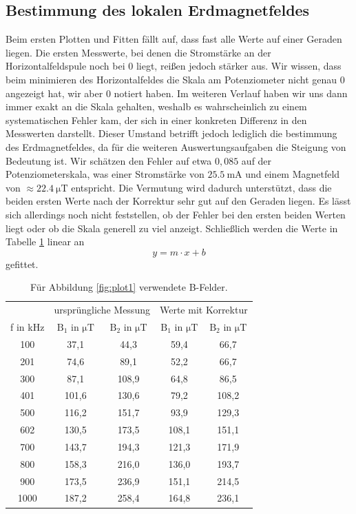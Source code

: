 \documentclass[
  bibliography=totoc,     %
  captions=tableheading,  %
  titlepage=firstiscover, %
]{scrartcl}
\begin{document}
\subsection{Bestimmung des lokalen Erdmagnetfeldes}
Beim ersten Plotten und Fitten fällt auf, dass fast alle Werte auf einer Geraden liegen.
Die ersten Messwerte, bei denen die Stromstärke an der Horizontalfeldspule noch bei 0 liegt,
reißen jedoch stärker aus. Wir wissen, dass beim minimieren des Horizontalfeldes
die Skala am Potenziometer nicht genau 0 angezeigt hat, wir aber 0 notiert haben.
Im weiteren Verlauf haben wir uns dann immer exakt an die Skala gehalten, weshalb es
wahrscheinlich zu einem systematischen Fehler kam, der sich in einer konkreten Differenz
in den Messwerten darstellt. Dieser Umstand betrifft jedoch lediglich die bestimmung des
Erdmagnetfeldes, da für die weiteren Auswertungsaufgaben die Steigung von
Bedeutung ist. Wir schätzen den Fehler auf etwa $0,085$ auf der Potenziometerskala,
was einer Stromstärke von $\SI{25.5}{\milli\ampere}$ und einem Magnetfeld von $\approx\SI{22.4}{\micro\tesla}$ entspricht. Die Vermutung wird dadurch
unterstützt, dass die beiden ersten Werte nach der Korrektur sehr gut auf den
Geraden liegen. Es lässt sich allerdings noch nicht feststellen, ob der Fehler bei den
ersten beiden Werten liegt oder ob die Skala generell zu viel anzeigt.
Schließlich werden die Werte in Tabelle \ref{tab:4} linear an
\begin{equation}
  y = m \cdot x + b
\end{equation}
gefittet.
\begin{table}[H]
  \centering
  \caption{Für Abbildung \ref{fig:plot1} verwendete B-Felder.}
  \label{tab:4}
  \begin{tabular}{c c c c c}
    \toprule
    & \multicolumn{2}{c}{ursprüngliche Messung} & \multicolumn{2}{c}{Werte mit Korrektur}\\
    f in \si{\kilo\hertz} & $\mathup{B}_\mathup{1}$ in $\si{\micro\tesla}$ & $\mathup{B}_\mathup{2}$ in $\si{\micro\tesla}$ & $\mathup{B}_\mathup{1}$ in $\si{\micro\tesla}$ & $\mathup{B}_\mathup{2}$ in $\si{\micro\tesla}$ \\
    \midrule
    100  &  37,1 &  44,3 &  59,4 &  66,7 \\
    201  &  74,6 &  89,1 &  52,2 &  66,7 \\
    300  &  87,1 & 108,9 &  64,8 &  86,5 \\
    401  & 101,6 & 130,6 &  79,2 & 108,2 \\
    500  & 116,2 & 151,7 &  93,9 & 129,3 \\
    602  & 130,5 & 173,5 & 108,1 & 151,1 \\
    700  & 143,7 & 194,3 & 121,3 & 171,9 \\
    800  & 158,3 & 216,0 & 136,0 & 193,7 \\
    900  & 173,5 & 236,9 & 151,1 & 214,5 \\
    1000 & 187,2 & 258,4 & 164,8 & 236,1 \\
    \bottomrule
  \end{tabular}
\end{table}
\end{document}
